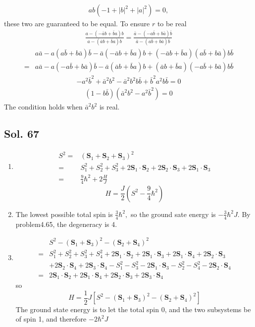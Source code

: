 \begin{align*}
    ab(-1 + |b|^2 + |a|^2) = 0,
\end{align*}
these two are guaranteed to be equal.
To ensure $r$ to be real
\begin{align*}
    \frac{a-(-\bar a b + \bar ba)b}{a-(\bar a b + \bar ba)b} = 
    \frac{\bar a-(-a \bar b + b\bar a)\bar b}
    {\bar a-( a \bar b + b\bar a)\bar b}
\end{align*}
\begin{align*}
    &a\bar a - a(a\bar b + b\bar a)\bar b
    -\bar a(-\bar a b + \bar ba)b 
    +(-\bar ab + \bar ba)(a\bar b + b\bar a)b\bar b\\
    =&a\bar a - a(-a\bar b + b\bar a)\bar b -
    \bar a(\bar ab+\bar ba)b + (\bar a b+\bar ba)(-a\bar b+b\bar a)b\bar b
\end{align*}
\begin{align*}
    -a^2\bar b^2 + \bar a^2b^2 - \bar a^2b^2 b\bar b + \bar b^2a^2b\bar b = 0
\end{align*}
\begin{align*}
    (1-b\bar b)(\bar a^2 b^2 - a^2\bar b^2) = 0
\end{align*}
The condition holds when $\bar a
^2b^2$ is real.

\subsection*{Sol. 67}
\begin{enumerate}
    \item 
    \begin{align*}
        S^2 =& (\bm S_1+\bm S_2 + \bm S_3)^2\\
        =&S_1^2 + S_2^2 + S_3^2 +
        2\bm S_1\cdot \bm S_2
        +2\bm S_2\cdot \bm S_3
        +2\bm S_1\cdot \bm S_3\\
        =&\frac{9}{4}\hbar^2 + 2\frac{H}{J}
    \end{align*}
    $$
    H = \frac{J}{2}(S^2-\frac{9}{4}\hbar^2)
    $$
    \item 
    The lowest possible total spin is 
    $\frac{3}{4}\hbar^2,$ so the ground sate energy is 
    $-\frac{3}{4}\hbar^2J.$
    By problem4.65, the degeneracy is 4.
    \item 
    \begin{align*}
        &S^2 - (\bm S_1 + \bm S_3)^2 - (\bm S_2 + \bm S_4)^2\\
        =&
        S_1^2+ S_2^2 + S_3^2 + S_4^2 +
        2\bm S_1\cdot \bm S_2
        +2\bm S_1\cdot \bm S_3
        +2\bm S_1\cdot \bm S_4
        +2\bm S_2\cdot \bm S_3\\
        &+2\bm S_2\cdot \bm S_4
        +2\bm S_3\cdot \bm S_4
        -S_1^2-S_3^2-2\bm S_1\cdot \bm S_3
        -S_2^2 - S_4^2 - 2\bm S_2\cdot \bm S_4
        \\
        =&
         2\bm S_1\cdot \bm S_2
        +2\bm S_1\cdot \bm S_4
        +2\bm S_2\cdot \bm S_3
        +2\bm S_3\cdot \bm S_4
    \end{align*}
    so
    $$
    H = \frac{1}{2}J\left[S^2 - (\bm S_1+\bm S_3)^2 - (\bm S_2 + \bm S_4)^2\right]
    $$
    The ground state energy is to let the total spin 0, and the two subsystems be of spin 1, and therefore
    $-2\hbar^2J$
 \end{enumerate}
